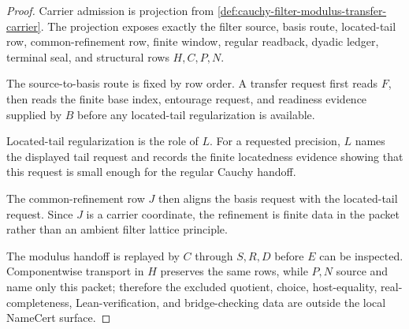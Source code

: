 \begin{proof}
Carrier admission is projection from \autoref{def:cauchy-filter-modulus-transfer-carrier}. The projection exposes exactly the filter source, basis route, located-tail row, common-refinement row, finite window, regular readback, dyadic ledger, terminal seal, and structural rows $H,C,P,N$.

The source-to-basis route is fixed by row order. A transfer request first reads $F$, then reads the finite base index, entourage request, and readiness evidence supplied by $B$ before any located-tail regularization is available.

Located-tail regularization is the role of $L$. For a requested precision, $L$ names the displayed tail request and records the finite locatedness evidence showing that this request is small enough for the regular Cauchy handoff.

The common-refinement row $J$ then aligns the basis request with the located-tail request. Since $J$ is a carrier coordinate, the refinement is finite data in the packet rather than an ambient filter lattice principle.

The modulus handoff is replayed by $C$ through $S,R,D$ before $E$ can be inspected. Componentwise transport in $H$ preserves the same rows, while $P,N$ source and name only this packet; therefore the excluded quotient, choice, host-equality, real-completeness, Lean-verification, and bridge-checking data are outside the local NameCert surface.
\end{proof}

